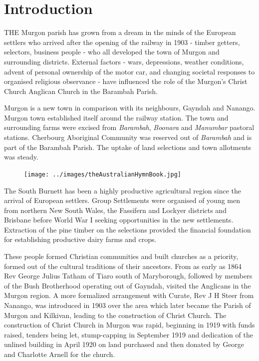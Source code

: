 \documentclass[a4paper,11pt,parskip=never,DIV=8,chapterprefix=true,titlepage=true,twoside,twocolumn,open=any]{scrbook}
\begin{document}
{
\setcounter{tocdepth}{2}
\tableofcontents
}

\twocolumn
\mainmatter
\setcounter{page}{1}


\chapter{Introduction}
\lettrine[lines=3]{T}{HE} Murgon parish has grown from a dream in the minds of the 
European settlers who arrived after the opening of the railway in 1903 - timber getters, 
selectors, business people - who all developed the town of Murgon and surrounding 
districts. External factors - wars, depressions, weather conditions, advent of personal 
ownership of the motor car, and changing societal responses to organised religious 
observance - have influenced the role of the Murgon's Christ Church Anglican Church 
in the Barambah Parish. 

Murgon is a new town in comparison with its neighbours, Gayndah and Nanango. Murgon 
town established itself around the railway station. The town and surrounding farms 
were excised from \emph{Barambah}, \emph{Boonara} and \emph{Manumbar} pastoral stations. 
Cherbourg Aboriginal Community was reserved out of \emph{Barambah} and is part of 
the Barambah Parish. The uptake of land selections and town allotments was steady.

\begin{figure}
\begin{center}
\texttt{[image: ../images/theAustralianHymnBook.jpg]}
\end{center}
\end{figure}

The South Burnett has been a highly productive agricultural region since the arrival 
of European settlers. Group Settlements were organised of young men from northern 
New South Wales, the Fassifern and Lockyer districts and Brisbane before World War I 
seeking opportunities in the new settlements. Extraction of the pine timber on the 
selections provided the financial foundation for establishing productive dairy farms 
and crops. 

These people formed Christian communities and built churches as a priority, formed 
out of the cultural traditions of their ancestors. From as early as 1864 Rev George 
Julius Tatham of Tiaro south of Maryborough, followed by members of the Bush Brotherhood 
operating out of Gayndah, visited the Anglicans in the Murgon region. A more formalized 
arrangement with Curate, Rev J H Steer from Nanango, was introduced in 1903 over the area 
which later became the Parish of Murgon and Kilkivan, leading to the construction of 
Christ Church.  The construction of Christ Church in Murgon was rapid, beginning in 
1919 with funds raised, tenders being let, stump-capping in September 1919 and dedication 
of the unlined building in April 1920 on land purchased and then donated by George and 
Charlotte Arnell for the church.
\end{document}
